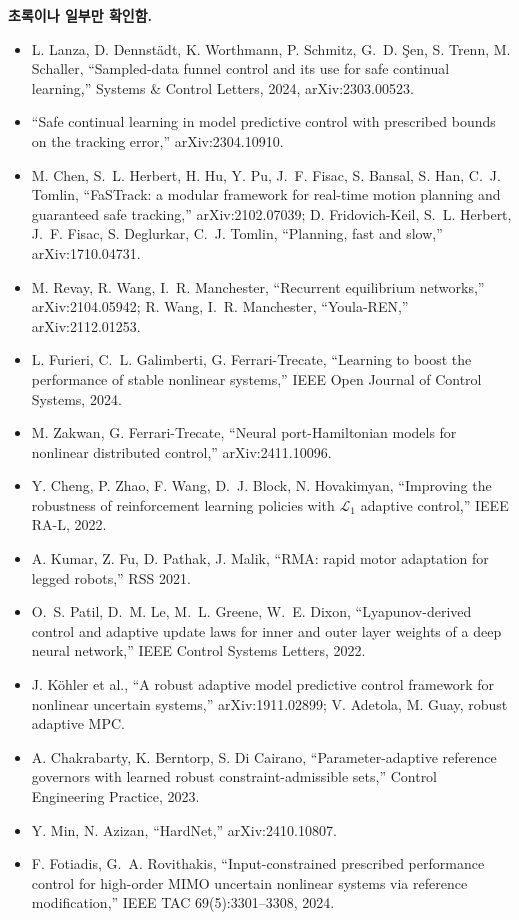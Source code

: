 \documentclass[11pt]{article}\usepackage[margin=1in]{geometry}\usepackage{amsmath,amssymb,amsthm,mathtools}\usepackage{graphicx}\graphicspath{{figures/}{../figures/}{figs/}{./}}\usepackage{enumitem}\usepackage{hyperref}\usepackage{cleveref}\usepackage{tikz}\usetikzlibrary{arrows.meta,positioning,calc,shapes.geometric}\usepackage{float}\usepackage{rotating}\usepackage[most]{tcolorbox}\usepackage{kotex}\usepackage{booktabs}\emergencystretch=1.6em\tolerance=2000 \crefname{assumption}{Assumption}{Assumptions}\Crefname{assumption}{Assumption}{Assumptions}\crefname{definition}{Definition}{Definitions}\Crefname{definition}{Definition}{Definitions}\crefname{proposition}{Proposition}{Propositions}\Crefname{proposition}{Proposition}{Propositions}\crefname{fact}{Fact}{Facts}\Crefname{fact}{Fact}{Facts} \newtheorem{assumption}{Assumption}\newtheorem{definition}{Definition}\newtheorem{lemma}{Lemma}\newtheorem{proposition}{Proposition}\newtheorem{theorem}{Theorem}\newtheorem{corollary}{Corollary}\newtheorem{fact}{Fact}\theoremstyle{remark}\newtheorem{remark}{Remark} \newcommand{\R}{\mathbb{R}}\newcommand{\xb}{\bar x}\newcommand{\Ab}{\bar A}\newcommand{\By}{\bar B_y}\newcommand{\U}{\mathcal U}\newcommand{\Z}{\mathcal Z}
\begin{document}
\textbf{초록이나 일부만 확인함.}
\begin{itemize}
\item L. Lanza, D. Dennst\"adt, K. Worthmann, P. Schmitz, G.~D. \c{S}en, S. Trenn, M. Schaller, ``Sampled-data funnel control and its use for safe continual learning,'' Systems \& Control Letters, 2024, arXiv:2303.00523.
\item ``Safe continual learning in model predictive control with prescribed bounds on the tracking error,'' arXiv:2304.10910.
\item M. Chen, S.~L. Herbert, H. Hu, Y. Pu, J.~F. Fisac, S. Bansal, S. Han, C.~J. Tomlin, ``FaSTrack: a modular framework for real-time motion planning and guaranteed safe tracking,'' arXiv:2102.07039; D. Fridovich-Keil, S.~L. Herbert, J.~F. Fisac, S. Deglurkar, C.~J. Tomlin, ``Planning, fast and slow,'' arXiv:1710.04731.
\item M. Revay, R. Wang, I.~R. Manchester, ``Recurrent equilibrium networks,'' arXiv:2104.05942; R. Wang, I.~R. Manchester, ``Youla-REN,'' arXiv:2112.01253.
\item L. Furieri, C.~L. Galimberti, G. Ferrari-Trecate, ``Learning to boost the performance of stable nonlinear systems,'' IEEE Open Journal of Control Systems, 2024.
\item M. Zakwan, G. Ferrari-Trecate, ``Neural port-Hamiltonian models for nonlinear distributed control,'' arXiv:2411.10096.
\item Y. Cheng, P. Zhao, F. Wang, D.~J. Block, N. Hovakimyan, ``Improving the robustness of reinforcement learning policies with $\mathcal L_1$ adaptive control,'' IEEE RA-L, 2022.
\item A. Kumar, Z. Fu, D. Pathak, J. Malik, ``RMA: rapid motor adaptation for legged robots,'' RSS 2021.
\item O.~S. Patil, D.~M. Le, M.~L. Greene, W.~E. Dixon, ``Lyapunov-derived control and adaptive update laws for inner and outer layer weights of a deep neural network,'' IEEE Control Systems Letters, 2022.
\item J. K\"ohler et al., ``A robust adaptive model predictive control framework for nonlinear uncertain systems,'' arXiv:1911.02899; V. Adetola, M. Guay, robust adaptive MPC.
\item A. Chakrabarty, K. Berntorp, S. Di Cairano, ``Parameter-adaptive reference governors with learned robust constraint-admissible sets,'' Control Engineering Practice, 2023.
\item Y. Min, N. Azizan, ``HardNet,'' arXiv:2410.10807.
\item F. Fotiadis, G.~A. Rovithakis, ``Input-constrained prescribed performance control for high-order MIMO uncertain nonlinear systems via reference modification,'' IEEE TAC 69(5):3301--3308, 2024.

\end{itemize}
\end{document}
